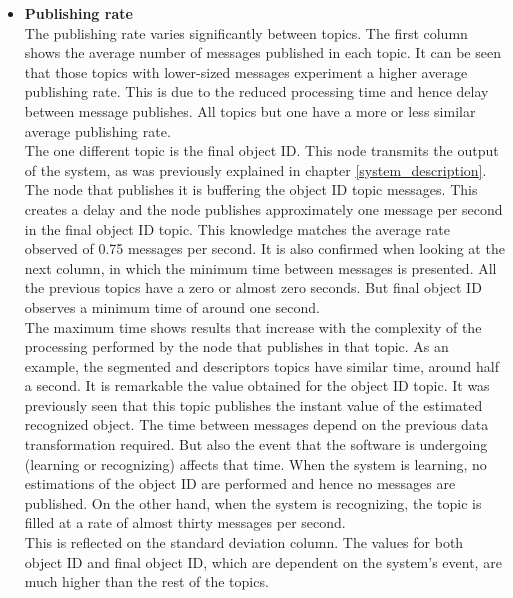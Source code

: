 			\begin{itemize}
				\item{\textbf{Publishing rate}}\\

			The publishing rate varies significantly between topics. 
			The first column shows the average number of messages published in each topic. 
			It can be seen that those topics with lower-sized messages experiment a higher average publishing rate. 
			This is due to the reduced processing time and hence delay between message publishes. 
			All topics but one have a more or less similar average publishing rate. 
			\\

			The one different topic is the final object ID. 
			This node transmits the output of the system, as was previously explained in chapter \ref{system_description}.
			The node that publishes it is buffering the object ID topic messages. 
			This creates a delay and the node publishes approximately one message per second in the final object ID topic. 
			This knowledge matches the average rate observed of 0.75 messages per second. 
			It is also confirmed when looking at the next column, in which the minimum time between messages is presented. 
			All the previous topics have a zero or almost zero seconds. 
			But final object ID observes a minimum time of around one second. 
			\\

			The maximum time shows results that increase with the complexity of the processing performed by the node that publishes in that topic. 
			As an example, the segmented and descriptors topics have similar time, around half a second. 
			It is remarkable the value obtained for the object ID topic. 
			It was previously seen that this topic publishes the instant value of the estimated recognized object. 
			The time between messages depend on the previous data transformation required. 
			But also the event that the software is undergoing (learning or recognizing) affects that time. 
			When the system is learning, no estimations of the object ID are performed and hence no messages are published. 
			On the other hand, when the system is recognizing, the topic is filled at a rate of almost thirty messages per second. 
			\\

			This is reflected on the standard deviation column. 
			The values for both object ID and final object ID, which are dependent on the system's event, are much higher than the rest of the topics. 


\end{itemize}
